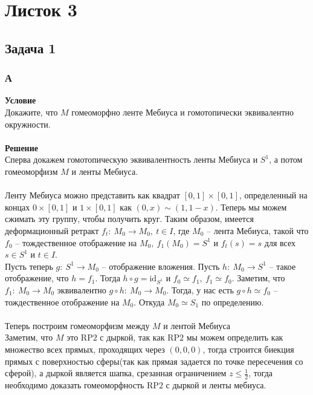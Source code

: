 \newpage
	\section{Листок 3}
		\subsection*{Задача 1}
			\subsubsection*{\textbf{А}}
			\textbf{Условие}\\
			Докажите, что $M$ гомеоморфно ленте Мебиуса и гомотопически эквивалентно окружности.\\
			\\
			\textbf{Решение}\\
			Сперва докажем гомотопическую эквивалентность ленты Мебиуса и $S^{1}$, а потом гомеоморфизм $M$ и ленты Мебиуса.\\
			\\
			Ленту Мебиуса можно представить как квадрат $[0,1] \times [0,1]$, определенный на концах $0 \times [0,1]$ и $1 \times [0,1]$ как $(0, x) \sim (1,1 - x)$. Теперь мы можем сжимать эту группу, чтобы получить круг. Таким образом, имеется деформационный ретракт $f_t:\: M_0 \to M_0,\ t\in I$, где $M_0$ -- лента Мебиуса, такой что $f_0$ -- тождественное отображение на $M_0,\ f_1(M_0) = S^1$ и $f_t(s) = s$ для всех $s \in S^1$ и $t \in I$.\\			
			Пусть теперь $g:\ S^1 \to M_0$ -- отображение вложения. Пусть $h:\ M_0 \to S^1$ -- такое отображение, что $h = f_1$. Тогда $h \circ g = \text{id}_{S^1}$ и $f_0\simeq f_1,\ f_1 \simeq f_0$. Заметим, что $f_1:\ M_0 \to M_0$ эквивалентно $g \circ h:\ M_0 \to M_0$. Тогда, у нас есть $g \circ h \simeq f_0$ -- тождественное отображение на $M_0$. Откуда $M_0 \simeq S_1$ по определению.\\
			\\
			Теперь построим гомеоморфизм между $M$ и лентой Мебиуса\\
			Заметим, что $M$ это $\text{RP}2$ с дыркой, так как $\text{RP}2$ мы можем определить как множество всех прямых, проходящих через $(0,0,0)$, тогда строится биекция прямых с поверхностью сферы(так как прямая задается по точке пересечения со сферой), а дыркой является шапка, срезанная ограничением $z \leqslant \frac{1}{2}$, тогда необходимо доказать гомеоморфность $\text{RP}2$ с дыркой и ленты мебиуса.\\
			\\
